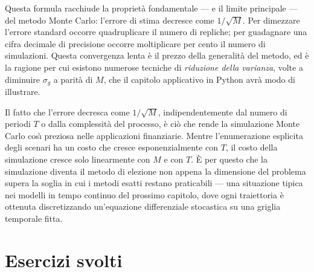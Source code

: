 Questa formula racchiude la propriet\`{a} fondamentale --- e il limite
principale --- del metodo Monte Carlo: l'errore di stima decresce come
$1/\sqrt{M}$. Per dimezzare l'errore standard occorre quadruplicare il
numero di repliche; per guadagnare una cifra decimale di precisione
occorre moltiplicare per cento il numero di simulazioni. Questa
convergenza lenta \`{e} il prezzo della generalit\`{a} del metodo, ed
\`{e} la ragione per cui esistono numerose tecniche di
\emph{riduzione della varianza}, volte a diminuire $\sigma_g$ a
parit\`{a} di $M$, che il capitolo applicativo in Python avr\`{a} modo di
illustrare.

\begin{remark}
Il fatto che l'errore decresca come $1/\sqrt{M}$, indipendentemente
dal numero di periodi $T$ o dalla complessit\`{a} del processo, \`{e}
ci\`{o} che rende la simulazione Monte Carlo cos\`{\i} preziosa nelle
applicazioni finanziarie. Mentre l'enumerazione esplicita degli
scenari ha un costo che cresce esponenzialmente con $T$, il costo
della simulazione cresce solo linearmente con $M$ e con $T$. \`{E}
per questo che la simulazione diventa il metodo di elezione non
appena la dimensione del problema supera la soglia in cui i metodi
esatti restano praticabili --- una situazione tipica nei modelli in
tempo continuo del prossimo capitolo, dove ogni traiettoria \`{e}
ottenuta discretizzando un'equazione differenziale stocastica su una
griglia temporale fitta.
\end{remark}

%

\section{Esercizi svolti}
\label{sec:esercizi-svolti}

